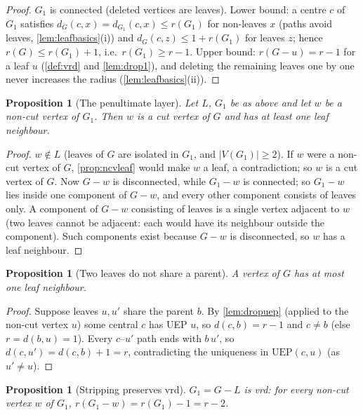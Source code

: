 \documentclass[11pt]{article}
\newtheorem{proposition}[theorem]{Proposition}
\theoremstyle{definition}
\begin{document}
\begin{proof}
$G_1$ is connected (deleted vertices are leaves).  Lower bound: a centre $c$
of $G_1$ satisfies $d_G(c,x)=d_{G_1}(c,x)\le r(G_1)$ for non-leaves $x$
(paths avoid leaves, \cref{lem:leafbasics}(i)) and
$d_G(c,z)\le1+r(G_1)$ for leaves $z$; hence
$r(G)\le r(G_1)+1$, i.e.\ $r(G_1)\ge r-1$.  Upper bound: $r(G-u)=r-1$ for a
leaf $u$ (\cref{def:vrd} and \cref{lem:drop1}), and deleting
the remaining leaves one by one never increases the radius
(\cref{lem:leafbasics}(ii)).
\end{proof}

\begin{proposition}[The penultimate layer]\label{prop:penult}
Let $L$, $G_1$ be as above and let $w$ be a non-cut vertex of $G_1$.  Then
$w$ is a cut vertex of $G$ and has at least one leaf neighbour.
\end{proposition}

\begin{proof}
$w\notin L$ (leaves of $G$ are isolated in $G_1$, and $|V(G_1)|\ge2$).  If
$w$ were a non-cut vertex of $G$, \cref{prop:ncvleaf} would make
$w$ a leaf, a contradiction; so $w$ is a cut vertex of $G$.  Now $G-w$ is
disconnected, while $G_1-w$ is connected; so $G_1-w$ lies inside one
component of $G-w$, and every other component consists of leaves only.  A
component of $G-w$ consisting of leaves is a single vertex adjacent to $w$
(two leaves cannot be adjacent: each would have its neighbour outside the
component).  Such components exist because $G-w$ is disconnected, so $w$ has
a leaf neighbour.
\end{proof}

\begin{proposition}[Two leaves do not share a parent]\label{prop:oneleaf}
A vertex of $G$ has at most one leaf neighbour.
\end{proposition}

\begin{proof}
Suppose leaves $u,u'$ share the parent $b$.  By
\cref{lem:dropuep} (applied to the non-cut vertex $u$) some central $c$
has UEP $u$, so $d(c,b)=r-1$ and $c\ne b$ (else $r=d(b,u)=1$).  Every
$c$--$u'$ path ends with $b\,u'$, so $d(c,u')=d(c,b)+1=r$, contradicting the
uniqueness in $\mathrm{UEP}(c,u)$ (as $u'\ne u$).
\end{proof}

\begin{proposition}[Stripping preserves vrd]\label{prop:stripsvrd}
$G_1=G-L$ is vrd: for every non-cut vertex $w$ of $G_1$,
$r(G_1-w)=r(G_1)-1=r-2$.
\end{proposition}
\end{document}
